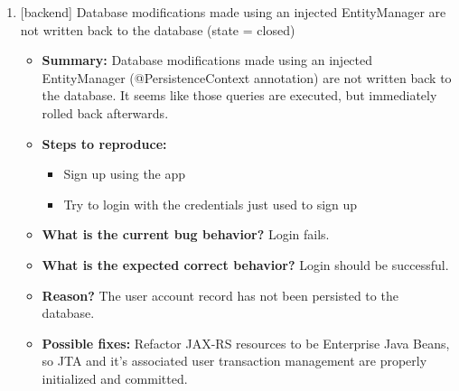 \begin{enumerate}
\item {[backend] Database modifications made using an injected EntityManager are not written back to the database (state = closed)}
\begin{itemize}	
	\item \textbf{Summary: }Database modifications made using an injected EntityManager (@PersistenceContext annotation) are not written back to the database. It seems like those queries are executed, but immediately rolled back afterwards.\\
	\item \textbf{Steps to reproduce: }
	\begin{itemize}
	\item Sign up using the app\\
	\item Try to login with the credentials just used to sign up\\
	\end{itemize}
	\item \textbf{What is the current bug behavior? } Login fails.\\
	\item \textbf{What is the expected correct behavior? } Login should be successful.\\
	\item \textbf{Reason? } The user account record has not been persisted to the database.\\
	\item \textbf{Possible fixes: } Refactor JAX-RS resources to be Enterprise Java Beans, so JTA and it's associated user transaction management are properly initialized and committed.\\
\end{itemize}


\end{enumerate}
